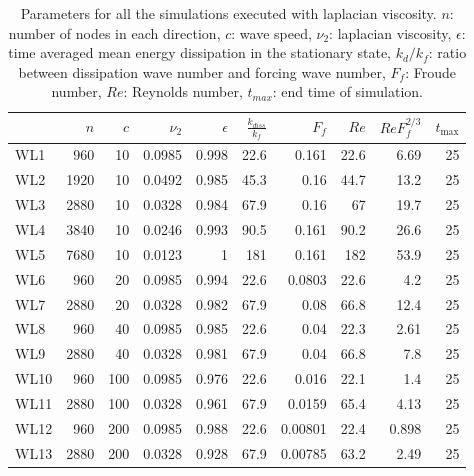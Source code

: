 \begin{table}
\begin{center}

\label{Table2}

\begin{tabular}{lrrrrrrrrr}
\toprule
{} &  $n$ &  $c$ &  $\nu_2$ &  $\epsilon$ &  $\frac{k_{diss}}{k_f}$ &   $F_f$ &  $Re$ &  $ReF_f^{2/3}$ &  $t_{\max}$ \\
\midrule
WL1  &  960 &   10 &   0.0985 &       0.998 &                    22.6 &   0.161 &  22.6 &           6.69 &          25 \\
WL2  & 1920 &   10 &   0.0492 &       0.985 &                    45.3 &    0.16 &  44.7 &           13.2 &          25 \\
WL3  & 2880 &   10 &   0.0328 &       0.984 &                    67.9 &    0.16 &    67 &           19.7 &          25 \\
WL4  & 3840 &   10 &   0.0246 &       0.993 &                    90.5 &   0.161 &  90.2 &           26.6 &          25 \\
WL5  & 7680 &   10 &   0.0123 &           1 &                     181 &   0.161 &   182 &           53.9 &          25 \\
WL6  &  960 &   20 &   0.0985 &       0.994 &                    22.6 &  0.0803 &  22.6 &            4.2 &          25 \\
WL7  & 2880 &   20 &   0.0328 &       0.982 &                    67.9 &    0.08 &  66.8 &           12.4 &          25 \\
WL8  &  960 &   40 &   0.0985 &       0.985 &                    22.6 &    0.04 &  22.3 &           2.61 &          25 \\
WL9  & 2880 &   40 &   0.0328 &       0.981 &                    67.9 &    0.04 &  66.8 &            7.8 &          25 \\
WL10 &  960 &  100 &   0.0985 &       0.976 &                    22.6 &   0.016 &  22.1 &            1.4 &          25 \\
WL11 & 2880 &  100 &   0.0328 &       0.961 &                    67.9 &  0.0159 &  65.4 &           4.13 &          25 \\
WL12 &  960 &  200 &   0.0985 &       0.988 &                    22.6 & 0.00801 &  22.4 &          0.898 &          25 \\
WL13 & 2880 &  200 &   0.0328 &       0.928 &                    67.9 & 0.00785 &  63.2 &           2.49 &          25 \\
\bottomrule
\end{tabular}

\caption{Parameters for all the simulations executed with laplacian viscosity.
$ n $: number of nodes in each direction, $ c $: wave speed, $ \nu_2 $: laplacian viscosity, $ \epsilon $: time
averaged mean energy dissipation in the stationary state, $ k_{d}/ k_f $: ratio
between dissipation wave number and forcing wave number, $F_f $: Froude
number, $Re$: Reynolds number, $ t_{max} $: end time of simulation.}
\end{center}
\end{table}

